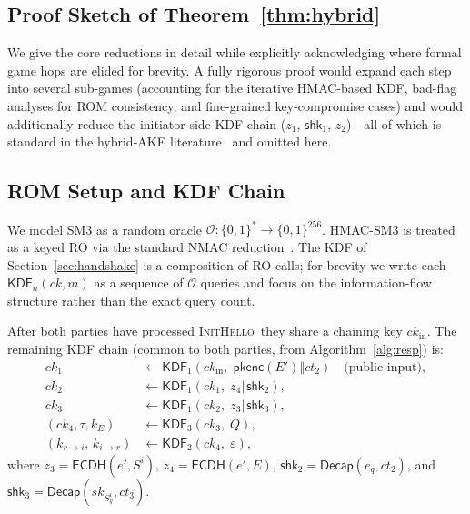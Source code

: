 \documentclass{SCIS2026}
\newcommand{\initmsg}{\textsc{InitHello}\xspace}
\newcommand{\concat}{\mathbin{\Vert}}
\newcommand{\KDF}{\mathsf{KDF}}
\newcommand{\ECDH}{\mathsf{ECDH}}
\newcommand{\Decap}{\mathsf{Decap}}
\newcommand{\pkenc}{\mathsf{pkenc}}
\begin{document}
\begin{appendix}

\section{Proof Sketch of Theorem~\ref{thm:hybrid}}
\label{sec:proof}

We give the core reductions in detail while explicitly acknowledging
where formal game hops are elided for brevity.  A fully rigorous proof
would expand each step into several sub-games (accounting for the
iterative HMAC-based KDF, bad-flag analyses for ROM consistency, and
fine-grained key-compromise cases) and would additionally reduce the
initiator-side KDF chain ($z_1$, $\textsf{shk}_1$, $z_2$)---all of
which is standard in the hybrid-AKE literature~\cite{14,32,35} and
omitted here.

\subsection{ROM Setup and KDF Chain}

We model SM3 as a random oracle $\mathcal{O} \colon \{0,1\}^* \to
\{0,1\}^{256}$.  HMAC-SM3 is treated as a keyed RO via the standard
NMAC reduction~\cite{34}.  The KDF of Section~\ref{sec:handshake}
is a composition of RO calls; for brevity we write each $\KDF_n(ck,m)$
as a sequence of $\mathcal{O}$ queries and focus on the information-flow
structure rather than the exact query count.

After both parties have processed \initmsg\ they share a chaining key
$ck_{\text{in}}$.  The remaining KDF chain (common to both parties,
from Algorithm~\ref{alg:resp}) is:
\begin{align}
ck_1 &\gets \KDF_1(ck_{\text{in}},\; \pkenc(E') \concat \textit{ct}_2)
  \quad\text{(public input)}, \label{eq:apx1} \\
ck_2 &\gets \KDF_1(ck_1,\; z_4 \concat \textsf{shk}_2), \label{eq:apx2} \\
ck_3 &\gets \KDF_1(ck_2,\; z_3 \concat \textsf{shk}_3), \label{eq:apx3} \\
(ck_4, \tau, k_E) &\gets \KDF_3(ck_3,\; Q), \label{eq:apx4} \\
(k_{r\to i},\, k_{i\to r}) &\gets \KDF_2(ck_4,\; \varepsilon), \label{eq:apx5}
\end{align}
where $z_3 = \ECDH(e', S^i)$, $z_4 = \ECDH(e', E)$,
$\textsf{shk}_2 = \Decap(e_q, \textit{ct}_2)$, and
$\textsf{shk}_3 = \Decap(\mathit{sk}_{S^i_q}, \textit{ct}_3)$.


\end{appendix}
\end{document}
